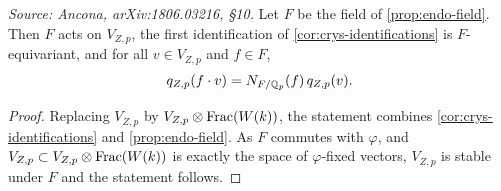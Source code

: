 \begin{corollary}
  \label{cor:F-acts-num}
  \textit{Source: Ancona, arXiv:1806.03216, \S10.}
  Let \(F\) be the field of \cref{prop:endo-field}. Then \(F\) acts on
  \(V_{Z,p}\), the first identification of \cref{cor:crys-identifications} is
  \(F\)-equivariant, and for all \(v \in V_{Z,p}\) and \(f \in F\),
  \begin{equation}
    q_{Z,p}(f \cdot v) = N_{F/\mathbb{Q}_p}(f)\, q_{Z,p}(v).
  \end{equation}
\end{corollary}

\begin{proof}
  Replacing \(V_{Z,p}\) by \(V_{Z,p} \otimes \mathrm{Frac}(W(k))\), the statement
  combines \cref{cor:crys-identifications} and \cref{prop:endo-field}. As \(F\)
  commutes with \(\varphi\), and \(V_{Z,p} \subset V_{Z,p} \otimes \mathrm{Frac}(W(k))\)
  is exactly the space of \(\varphi\)-fixed vectors, \(V_{Z,p}\) is stable under
  \(F\) and the statement follows.
\end{proof}

